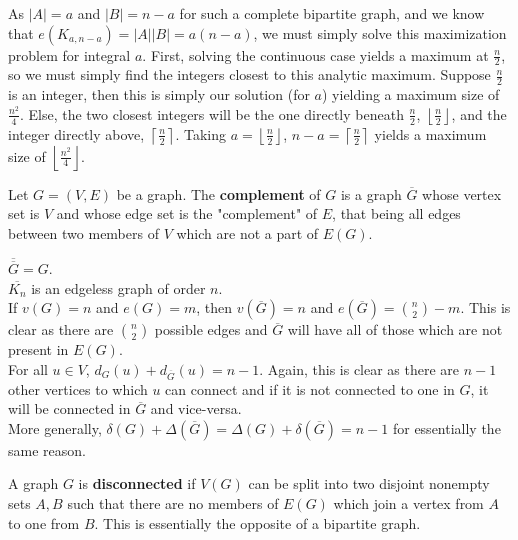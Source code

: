 \begin{solution}
	As $\left| A \right| = a$ and $\left| B \right| = n-a$ for such a complete bipartite graph, and we know that $e\left( K_{a, n-a} \right) =\left| A \right| \left| B \right| = a\left( n-a \right) $, we must simply solve this maximization problem for integral $a$. First, solving the continuous case yields a maximum at $\frac{n}{2}$, so we must simply find the integers closest to this analytic maximum. Suppose  $\frac{n}{2}$ is an integer, then this is simply our solution (for $a$) yielding a maximum size of  $\frac{n^{2}}{4}$. Else, the two closest integers will be the one directly beneath $\frac{n}{2}$, $\left\lfloor \frac{n}{2} \right\rfloor$, and the integer directly above, $\left\lceil \frac{n}{2} \right\rceil $. Taking $a = \left\lfloor \frac{n}{2} \right\rfloor$, $n-a = \left\lceil \frac{n}{2} \right\rceil $ yields a maximum size of $\left\lfloor \frac{n^2}{4} \right\rfloor$.
\end{solution}
\begin{definition}
	Let $G = \left( V,E \right) $ be a graph. The \textbf{complement} of $G$ is a graph $\overline{G}$ whose vertex set is $V$ and whose edge set is the "complement" of $E$, that being all edges between two members of $V$ which are not  a part of $E\left( G \right) $.
\end{definition}
\begin{example}
	$\overline{\overline{G}}= G$.\\
	$\overline{K_{n}}$ is an edgeless graph of order $n$.\\
	If $v\left( G \right)  = n$ and $e\left( G \right)  = m$, then $v\left( \overline{G} \right) = n$ and $e\left( \overline{G} \right)  = \binom{n}{2}- m$. This is clear as there are $\binom{n}{2}$ possible edges and $\overline{G}$ will have all of those which are not present in $E\left( G \right) $.\\
	For all $u \in V$, $d_{G} \left( u \right)  + d_{\overline{G}}\left( u \right) = n-1$. Again, this is clear as there are $n-1$ other vertices to which $u$ can connect and if it is not connected to one in $G$, it will be connected in $\overline{G}$ and vice-versa.\\
	More generally, $\delta \left( G \right) + \Delta \left( \overline{G} \right) = \Delta \left( G \right)  + \delta \left( \overline{G} \right)  = n-1$ for essentially the same reason.
\end{example}
\begin{definition}
	A graph $G$ is \textbf{disconnected} if $V\left( G \right) $ can be split into two disjoint nonempty sets $A, B$ such that there are no members of $E \left( G \right) $ which join a vertex from $A$ to one from $B$. This is essentially the opposite of a bipartite graph.
\end{definition}
